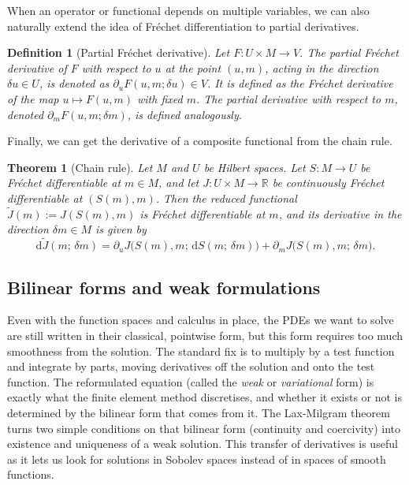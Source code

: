 \documentclass[a4paper,11pt]{article}
\newcommand{\R}{\mathbb{R}}
\newcommand{\Jt}{\tilde{J}}                  %
\newcommand{\Mspace}{M}
\theoremstyle{spacedplain} \newtheorem{theorem}[counter]{Theorem} \newtheorem{lemma}[counter]{Lemma} \newtheorem{prop}[counter]{Proposition} \newtheorem{cor}[counter]{Corollary}
\theoremstyle{spaceddefinition} \newtheorem{defn}[counter]{Definition} \newtheorem{example}[counter]{Example} \newtheorem{remark}[counter]{Remark}
\begin{document}
When an operator or functional depends on multiple variables, we can also naturally extend the idea of Fr{\'e}chet differentiation to partial derivatives.

\begin{defn}[Partial Fr{\'e}chet derivative]
\label{defn:partial-frechet} Let $F : U \times \Mspace \to V$. The \emph{partial Fr{\'e}chet derivative} of $F$ with respect to $u$ at the point $(u, m)$, acting in the direction $\delta u \in U$, is denoted as $\partial_u F(u, m; \delta u) \in V$. It is defined as the Fr{\'e}chet derivative of the map $u \mapsto F(u, m)$ with fixed $m$. The partial derivative with respect to $m$, denoted $\partial_m F(u, m; \delta m)$, is defined analogously.
\end{defn}

Finally, we can get the derivative of a composite functional from the chain rule.

\begin{theorem}[Chain rule]
\label{thm:chain} Let $\Mspace$ and $U$ be Hilbert spaces. Let $S : \Mspace \to U$ be Fr{\'e}chet differentiable at $m \in \Mspace$, and let $J : U \times \Mspace \to \R$ be continuously Fr{\'e}chet differentiable at $(S(m), m)$. Then the reduced functional $\Jt(m) := J(S(m), m)$ is Fr{\'e}chet differentiable at $m$, and its derivative in the direction $\delta m \in \Mspace$ is given by
\begin{equation}
  \mathrm{d} \Jt(m;\, \delta m)
  = \partial_u J\bigl( S(m), m;\, \mathrm{d} S(m;\, \delta m) \bigr)
  + \partial_m J\bigl( S(m), m;\, \delta m \bigr).
\end{equation}
\end{theorem}

\subsection{Bilinear forms and weak formulations}
\label{sec:prelim:weakforms}

Even with the function spaces and calculus in place, the PDEs we want to solve are still written in their classical, pointwise form, but this form requires too much smoothness from the solution. The standard fix is to multiply by a test function and integrate by parts, moving derivatives off the solution and onto the test function. The reformulated equation (called the \emph{weak} or \emph{variational} form) is exactly what the finite element method discretises, and whether it exists or not is determined by the bilinear form that comes from it. The Lax-Milgram theorem turns two simple conditions on that bilinear form (continuity and coercivity) into existence and uniqueness of a weak solution. This transfer of derivatives is useful as it lets us look for solutions in Sobolev spaces instead of in spaces of smooth functions. 
\end{document}
